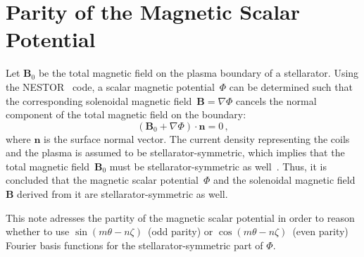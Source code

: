 \section{Parity of the Magnetic Scalar Potential}
Let $\mathbf{B}_0$ be the total magnetic field on the plasma boundary of a stellarator.
Using the NESTOR~\cite{merkel_1986} code, a scalar magnetic potential~$\Phi$ can be determined
such that the corresponding solenoidal magnetic field~$\mathbf{B} = \nabla \Phi$
cancels the normal component of the total magnetic field on the boundary:
\begin{equation}
  \left(\mathbf{B}_0 + \nabla \Phi \right) \cdot \mathbf{n} = 0 \, ,
\end{equation}
where $\mathbf{n}$ is the surface normal vector.
The current density representing the coils and the plasma is assumed to be stellarator-symmetric,
which implies that the total magnetic field~$\mathbf{B}_0$ must be stellarator-symmetric as well~\cite{dewar_hudson_1998_stellarator_symmetry}.
Thus, it is concluded that the magnetic scalar potential~$\Phi$ and the solenoidal magnetic field~$\mathbf{B}$ derived from
it are stellarator-symmetric as well.

This note adresses the partity of the magnetic scalar potential
in order to reason whether to use $\sin(m\theta-n\zeta)$~(odd parity) or $\cos(m\theta-n\zeta)$~(even parity) Fourier basis functions for the stellarator-symmetric part of $\Phi$.

